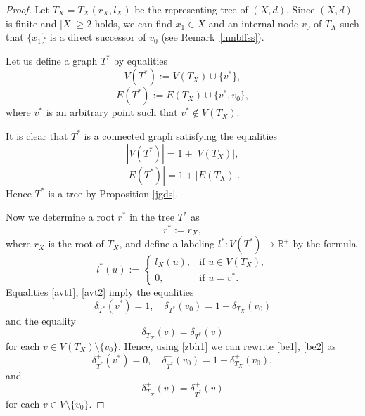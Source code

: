 \documentclass[pdflatex,sn-mathphys-num]{sn-jnl}%
\theoremstyle{thmstyleone}%
\theoremstyle{thmstyletwo}%
\theoremstyle{thmstylethree}%
\theoremstyle{thmstyletwo}%
\theoremstyle{thmstylethree}%
\begin{document}
\begin{proof}
Let $T_X=T_X(r_X,l_X)$ be the representing tree of $(X,d)$. Since $(X,d)$ is finite and $|X|\ge2$ holds, we can find $x_1 \in X$ and an internal node $v_0$ of $T_X$ such that $\{x_1\}$ is a direct successor of $v_0$ (see Remark~\ref{mnbffss}).

Let us define a graph $T^*$ by equalities
\begin{equation}
    \label{avt1}
V(T^*) := V(T_X)\cup\{v^*\},
\end{equation}
\begin{equation}
    \label{avt2}
E(T^*) := E(T_X)\cup\{v^*,v_0\},
\end{equation}
where $v^*$ is an arbitrary point such that $v^*\notin V(T_X)$.

It is clear that $T^*$ is a connected graph satisfying the equalities
\[
|V(T^*)| = 1 + |V(T_X)|,
\]
\[
|E(T^*)| = 1 + |E(T_X)|.
\]
Hence $T^*$ is a tree by Proposition \ref{jgds}.





Now we determine a root $r^*$ in the tree $T^*$ as
\begin{equation}
    \label{a1}
r^* := r_X,
\end{equation}
where $r_X$ is the root of $T_X$, and define a labeling
\(
l^* : V(T^*) \to \mathbb{R}^+
\)
by the formula
\begin{equation}
    \label{a2}
l^*(u) :=
\begin{cases}
l_X(u), & \text{if } u \in V(T_X),\\
0, & \text{if } u = v^*.
\end{cases}
\end{equation}
Equalities \eqref{avt1}, \eqref{avt2} imply the equalities
\begin{equation}
    \label{be1}
\delta_{T^*}(v^*) = 1,\quad
\delta_{T^*}(v_0) = 1 + \delta_{T_X}(v_0) 
\end{equation}
and the equality
\begin{equation}
    \label{be2}
\delta_{T_X}(v) = \delta_{T^*}(v)
\end{equation}
for each $v \in V(T_X)\setminus\{v_0\}$.
Hence, using \eqref{zbh1} we can rewrite \eqref{be1}, \eqref{be2} as
\begin{equation}
    \label{be3}
\delta^{+}_{T^*}(v^*) = 0,
\quad
\delta^{+}_{T^*}(v_0) = 1 + \delta^{+}_{T_X}(v_0), 
\end{equation}
and
\begin{equation}
    \label{be4}
\delta^{+}_{T_X}(v) = \delta^{+}_{T^*}(v)
\end{equation}
for each $v \in V\setminus\{v_0\}$.



\end{proof}
\end{document}
